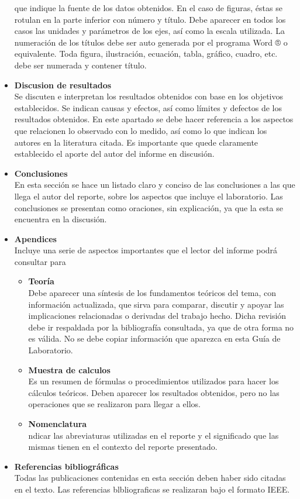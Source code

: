 \documentclass{report}
\begin{document}
\begin{itemize}
que indique la fuente de los datos obtenidos. En el caso de figuras, éstas se
rotulan en la parte inferior con número y título. Debe aparecer en todos los casos
las unidades y parámetros de los ejes, así como la escala utilizada.
La numeración de los títulos debe ser auto generada por el programa Word ® o
equivalente. Toda figura, ilustración, ecuación, tabla, gráfico, cuadro, etc. debe ser
numerada y contener título.
\item \textbf{Discusion de resultados}\\
Se discuten e interpretan los resultados obtenidos con base en los objetivos
establecidos. Se indican causas y efectos, así como límites y defectos de los
resultados obtenidos. En este apartado se debe hacer referencia a los aspectos
que relacionen lo observado con lo medido, así como lo que indican los autores en
la literatura citada. Es importante que quede claramente establecido el aporte del
autor del informe en discusión.
\item \textbf{Conclusiones}\\
En esta sección se hace un listado claro y conciso de las conclusiones a las que
llega el autor del reporte, sobre los aspectos que incluye el laboratorio. Las
conclusiones se presentan como oraciones, sin explicación, ya que la esta se
encuentra en la discusión.\\
\item \textbf{Apendices}\\
Incluye una serie de aspectos importantes que el lector del informe podrá
consultar para\begin{itemize}
\item \textbf{Teoría}\\
Debe aparecer una síntesis de los fundamentos teóricos del tema, con información
actualizada, que sirva para comparar, discutir y apoyar las implicaciones
relacionadas o derivadas del trabajo hecho. Dicha revisión debe ir respaldada por
la bibliografía consultada, ya que de otra forma no es válida. No se debe copiar
información que aparezca en esta Guía de Laboratorio.\\
\item \textbf{Muestra de calculos}\\
Es un resumen de fórmulas o procedimientos utilizados para hacer los cálculos
teóricos. Deben aparecer los resultados obtenidos, pero no las operaciones que se
realizaron para llegar a ellos.
\item \textbf{Nomenclatura}\\
ndicar las abreviaturas utilizadas en el reporte y el significado que las mismas
tienen en el contexto del reporte presentado.\\
\end{itemize} 
\item \textbf{Referencias bibliográficas}\\
Todas las publicaciones contenidas en esta sección deben haber sido citadas en
el texto. Las referencias blbliograficas se realizaran bajo el formato IEEE.
\end{itemize}
\end{document}
